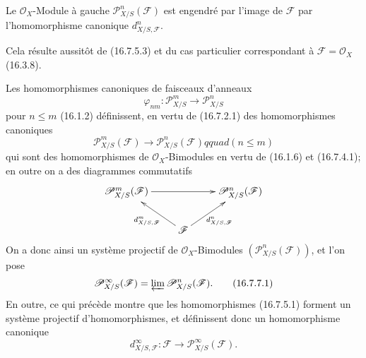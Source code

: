 \begin{proposition}[16.7.6]
\label{IV.16.7.6}
Le $\mathcal{O}_X$-Module à gauche $\mathscr{P}_{X/S}^n(\mathscr{F})$ est
engendré par l'image de $\mathscr{F}$ par l'homomorphisme canonique
$d_{X/S,\mathscr{F}}^n$.
\end{proposition}

Cela résulte aussitôt de (16.7.5.3) et du cas particulier correspondant à
$\mathscr{F}=\mathcal{O}_X$ (16.3.8).

\begin{env}[16.7.7]
\label{IV.16.7.7}
Les homomorphismes canoniques de faisceaux d'anneaux
\[
  \varphi_{nm}:\mathscr{P}_{X/S}^m\longrightarrow\mathscr{P}_{X/S}^n
\]
pour $n\leq m$ (16.1.2) définissent, en vertu de (16.7.2.1) des
homomorphismes canoniques
\[
  \mathscr{P}_{X/S}^m(\mathscr{F})
  \longrightarrow\mathscr{P}_{X/S}^n(\mathscr{F})qquad(n\leq m)
\]
qui sont des homomorphismes de $\mathcal{O}_X$-Bimodules en vertu de (16.1.6)
et (16.7.4.1); en outre on a des diagrammes commutatifs
\[
  \xymatrix{
    \mathscr{P}_{X/S}^m(\mathscr{F})\ar[rr]
      &&\mathscr{P}_{X/S}^n(\mathscr{F})\\
    &\mathscr{F}\ar[ul]^-{d_{X/S,\mathscr{F}}^m}
      \ar[ur]_-{d_{X/S,\mathscr{F}}^n}
  }
\]
On a donc ainsi un système projectif de $\mathcal{O}_X$-Bimodules
$(\mathscr{P}_{X/S}^n(\mathscr{F}))$, et l'on pose
\[
  \mathscr{P}_{X/S}^{\infty}(\mathscr{F})
  =\varprojlim\mathscr{P}_{X/S}^n(\mathscr{F}).
  \tag{16.7.7.1}
  \label{IV.16.7.7.1}
\]
En outre, ce qui précède montre que les homomorphismes (16.7.5.1) forment un
système projectif d'homomorphismes, et définissent donc un homomorphisme
canonique
\[
  d_{X/S,\mathscr{F}}^{\infty}:\mathscr{F}
  \longrightarrow\mathscr{P}_{X/S}^{\infty}(\mathscr{F}).
  \tag{16.7.7.2}
  \label{IV.16.7.7.2}
\]
\end{env}


